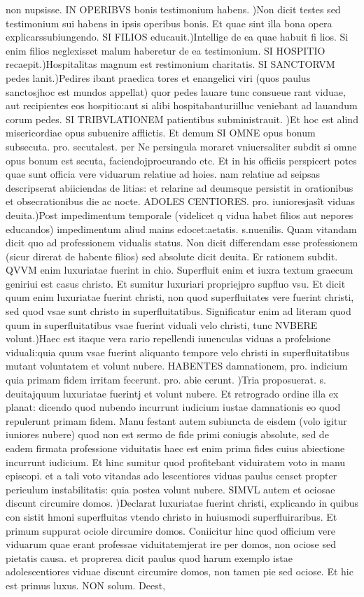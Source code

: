 \documentclass{article}
\begin{document}
\begin{pages}
non nupsisse. IN OPERIBVS bonis testimonium habens. )Non dicit testes sed testimonium sui habens in ipsis operibus bonis. Et quae sint illa bona opera explicarssubiungendo. SI FILIOS educauit.)Intellige de ea quae habuit fi lios. Si enim filios neglexisset malum haberetur de ea testimonium. SI HOSPITIO recaepit.)Hospitalitas magnum est restimonium charitatis. SI SANCTORVM pedes lanit.)Pedires ibant praedica tores et enangelici viri (quos paulus sanctosjhoc est mundos appellat) quor pedes lauare tunc consueue rant viduae, aut recipientes eos hospitio:aut si alibi hospitabanturiilluc veniebant ad lauandum corum pedes. SI TRIBVLATIONEM patientibus subministrauit. )Et hoc est alind misericordiae opus subuenire afflictis. Et demum SI OMNE opus bonum subsecuta. pro. secutalest. per Ne persingula moraret vniuersaliter subdit si omne opus bonum est secuta, faciendojprocurando etc. Et in his officiis perspicert potes quae sunt officia vere viduarum relatiue ad hoies. nam relatiue ad seipsas descripserat abiiciendas de litias: et relarine ad deumsque persistit in orationibus et obsecrationibus die ac nocte.  \pend\pstart ADOLES CENTIORES. pro. iunioresjasĩt viduas deuita.)Post impedimentum temporale (videlicet q vidua habet filios aut nepores educandos) impedimentum aliud mains edocet:aetatis. s.nuenilis. Quam vitandam dicit quo ad professionem vidualis status. Non dicit differendam esse professionem (sicur direrat de habente filios) sed absolute dicit deuita. Er rationem subdit. QVVM enim luxuriatae fuerint in chio. Superfluit enim et iuxra textum graecum geniriui est casus christo. Et sumitur luxuriari propriejpro supfluo vsu. Et dicit quum enim luxuriatae fuerint christi, non quod superfluitates vere fuerint christi, sed quod vsae sunt christo in superfluitatibus. Significatur enim ad literam quod quum in superfluitatibus vsae fuerint viduali velo christi, tunc NVBERE volunt.)Haec est itaque vera rario repellendi iuuenculas viduas a profelsione viduali:quia quum vsae fuerint aliquanto tempore velo christi in superfluitatibus mutant voluntatem et volunt nubere. HABENTES damnationem, pro. indicium quia primam fidem irritam fecerunt. pro. abie cerunt. )Tria proposuerat. s. deuitajquum luxuriatae fuerintj et volunt nubere. Et retrogrado ordine illa ex planat: dicendo quod nubendo incurrunt iudicium iustae damnationis eo quod repulerunt primam fidem. Manu festant autem subiuncta de eisdem (volo igitur iuniores nubere) quod non est sermo de fide primi coniugis absolute, sed de eadem firmata professione viduitatis haec est enim prima fides cuius abiectione incurrunt iudicium. Et hinc sumitur quod profitebant viduiratem voto in manu episcopi. et a tali voto vitandas ado lescentiores viduas paulus censet propter periculum instabilitatis: quia postea volunt nubere. SIMVL autem et ociosae discunt circumire domos. )Declarat luxuriatae fuerint christi, explicando in quibus con sistit hmoni superfluitas vtendo christo in huiusmodi superfluiraribus. Et primum suppurat ociole dircumire domos. Coniicitur hinc quod officium vere viduarum quae erant professae viduitatemjerat ire per domos, non ociose sed pietatis causa. et proprerea dicit paulus quod harum exemplo istae adolescentiores viduae discunt circumire domos, non tamen pie sed ociose. Et hic est primus luxus. NON solum. Deest, 
\end{pages}
\end{document}

